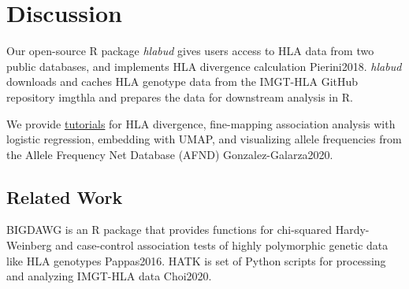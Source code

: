 \section{Discussion} \label{discussion}

Our open-source R package \textit{hlabud} gives users access to HLA data from two public databases, and implements HLA divergence calculation Pierini2018.
\textit{hlabud} downloads and caches HLA genotype data from the IMGT-HLA GitHub repository imgthla and prepares the data for downstream analysis in R.

We provide \href{https://slowkow.github.io/hlabud}{tutorials} for HLA divergence, fine-mapping association analysis with logistic regression, embedding with UMAP, and visualizing allele frequencies from the Allele Frequency Net Database (AFND) Gonzalez-Galarza2020.

\subsection{Related Work}

BIGDAWG is an R package that provides functions for chi-squared Hardy-Weinberg and case-control association tests of highly polymorphic genetic data like HLA genotypes Pappas2016. HATK is set of Python scripts for processing and analyzing IMGT-HLA data Choi2020.
